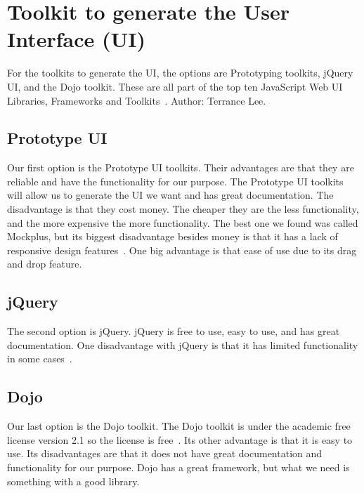 \documentclass[10pt,draftclsnofoot,onecolumn]{IEEEtran}
\begin{document}
    \section{Toolkit to generate the User Interface (UI)}
 	For the toolkits to generate the UI, the options are Prototyping toolkits, jQuery UI, and the Dojo toolkit.
	These are all part of the top ten JavaScript Web UI Libraries, Frameworks and Toolkits~\cite{10-javascript-web-ui-libraries-frameworks-and-toolkits}.
	Author: Terrance Lee.

   	\subsection{Prototype UI}
   	Our first option is the Prototype UI toolkits. 
	Their advantages are that they are reliable and have the functionality for our purpose. 
	The Prototype UI toolkits will allow us to generate the UI we want and has great documentation.
	The disadvantage is that they cost money. 
	The cheaper they are the less functionality, and the more expensive the more functionality. 
	The best one we found was called Mockplus, but its biggest disadvantage besides money is that it has a lack of responsive design
	features~\cite{pros-and-cons-of-four-prototyping-tools}.
	One big advantage is that ease of use due to its drag and drop feature.

   	\subsection{jQuery}
   	The second option is jQuery. jQuery is free to use, easy to use, and has great documentation.
	One disadvantage with jQuery is that it has limited functionality in some cases~\cite{jquery-disadvantages-and-advantages}.

   	\subsection{Dojo}
   	Our last option is the Dojo toolkit.
	The Dojo toolkit is under the academic free license version 2.1 so the license is free~\cite{dojo-toolkit-license}.
	Its other advantage is that it is easy to use.
	Its disadvantages are that it does not have great documentation and functionality for our purpose.
	Dojo has a great framework, but what we need is something with a good library.
\end{document}

